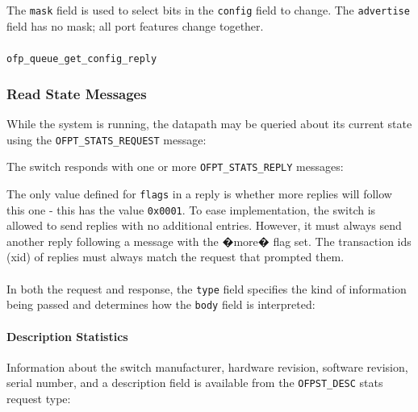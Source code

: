 
The \verb|mask| field is used to select bits in the \verb|config| field to change.  The \verb|advertise| field has no mask; all port features change together.

\subsubsection{}
 \verb|ofp_queue_get_config_reply| 

\subsubsection{Read State Messages}
While the system is running, the datapath may be queried about its current state using the \verb|OFPT_STATS_REQUEST| message:


The switch responds with one or more \verb|OFPT_STATS_REPLY| messages:


The only value defined for \verb|flags| in a reply is whether more replies will follow this one - this has the value \verb|0x0001|.  To ease implementation, the switch is allowed to send replies with no additional entries.  However, it must always send another reply following a message with the �more� flag set.  The transaction ids (xid) of replies must always match the request that prompted them.
\\\\
In both the request and response, the \verb|type| field specifies the kind of information being passed and determines how the \verb|body| field is interpreted:



\paragraph{Description Statistics}
Information about the switch manufacturer, hardware revision, software revision, serial number, and a description field is available from the \verb|OFPST_DESC| stats request type:

